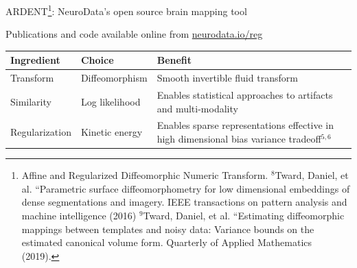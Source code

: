 \documentclass{beamer}
\begin{document}
\begin{frame}{ARDENT\footnote{Affine and Regularized Diffeomorphic Numeric Transform.  $^8$Tward, Daniel, et al. ``Parametric surface diffeomorphometry for low dimensional embeddings of dense segmentations and imagery. IEEE transactions on pattern analysis and machine intelligence (2016) $^9$Tward, Daniel, et al. ``Estimating diffeomorphic mappings between templates and noisy data: Variance bounds on the estimated canonical volume form. Quarterly of Applied Mathematics (2019). }: NeuroData's open source brain mapping tool }

Publications and code available online from \url{neurodata.io/reg}



\vspace{-1.5em}

\begin{table}
\begin{tabular}{p{2.1cm}p{2.3cm}p{5.3cm}}
Ingredient & Choice & Benefit\\
\hline
\hline
Transform & Diffeomorphism & Smooth invertible fluid transform\\
\hline
Similarity & Log likelihood & Enables statistical approaches to artifacts and multi-modality\\
\hline
Regularization & Kinetic energy & Enables sparse representations effective in high dimensional bias variance tradeoff$^{5,6}$
\end{tabular}
\end{table}


\vspace{-1em}


\end{frame}
\end{document}
